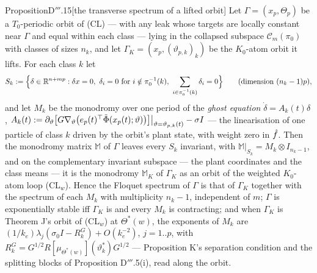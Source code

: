 \begin{thm}{Proposition}{D$'''$.15}[the transverse spectrum of a lifted orbit]
Let $\Gamma = (x_p,\Theta_p)$ be a $T_0$-periodic orbit of \textup{(CL)} --- with any leak whose targets are locally
constant near $\Gamma$ and equal within each class --- lying in the collapsed subspace $\mathcal{C}_m(\pi_0)$ with
classes of sizes $n_k$, and let $\Gamma_K = (x_p,(\vartheta_{p,k})_k)$ be the $K_0$-atom orbit it lifts. For each
class $k$ let
\[
  S_k := \Bigl\{\delta\in\mathbb{R}^{n+mp} : \delta x = 0,\ \delta_i = 0\text{ for }i\notin\pi_0^{-1}(k),\
  \sum_{i\in\pi_0^{-1}(k)}\delta_i = 0\Bigr\}\qquad\text{(dimension $(n_k - 1)p$)},
\]
and let $M_k$ be the monodromy over one period of the \emph{ghost equation} $\dot\delta = A_k(t)\delta$,
$A_k(t) := \partial_\vartheta\bigl[G\nabla_\vartheta\bigl(e_p(t)^\top\tilde\Phi(x_p(t);\vartheta)\bigr)\bigr]
\big|_{\vartheta=\vartheta_{p,k}(t)} - \sigma I$ --- the linearisation of one particle of class $k$ driven by the
orbit's plant state, with weight zero in $\hat f$. Then the monodromy matrix $\mathbb{M}$ of $\Gamma$ leaves every
$S_k$ invariant, with $\mathbb{M}|_{S_k} = M_k\otimes I_{n_k-1}$, and on the complementary invariant subspace --- the
plant coordinates and the class means --- it is the monodromy $\mathbb{M}_K$ of $\Gamma_K$ as an orbit of the
weighted $K_0$-atom loop \textup{(CL$_w$)}. Hence the Floquet spectrum of $\Gamma$ is that of $\Gamma_K$ together
with the spectrum of each $M_k$ with multiplicity $n_k - 1$, independent of $m$; $\Gamma$ is exponentially stable iff
$\Gamma_K$ is and every $M_k$ is contracting; and when $\Gamma_K$ is Theorem J's orbit of \textup{(CL$_w$)} at
$\Theta^*(w)$, the exponents of $M_k$ are $(1/k_e)\lambda_j(\sigma_0I - R^G_k) + O(k_e^{-2})$, $j = 1..p$, with
$R^G_k = G^{1/2}R[\mu_{\Theta^*(w)}](\vartheta^*_k)G^{1/2}$ --- Proposition K's separation condition and the
splitting blocks of Proposition D$'''$.5(i), read along the orbit.
\end{thm}

